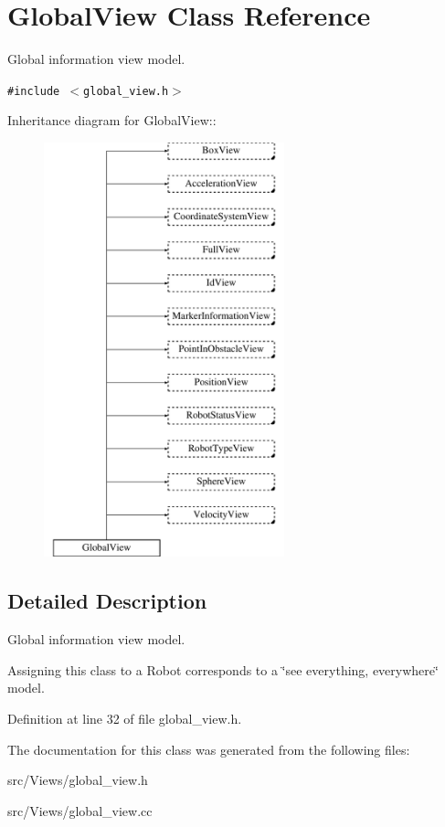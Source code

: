 \hypertarget{class_global_view}{
\section{GlobalView Class Reference}
\label{class_global_view}
}
Global information view model.  


{\tt \#include $<$global\_\-view.h$>$}

Inheritance diagram for GlobalView::\begin{figure}[H]
\begin{center}
\leavevmode
\includegraphics[height=12cm]{class_global_view}
\end{center}
\end{figure}


\subsection{Detailed Description}
Global information view model. 

Assigning this class to a Robot corresponds to a \char`\"{}see everything, everywhere\char`\"{} model. 

Definition at line 32 of file global\_\-view.h.

The documentation for this class was generated from the following files:\begin{CompactItemize}
\item 
src/Views/global\_\-view.h\item 
src/Views/global\_\-view.cc\end{CompactItemize}
